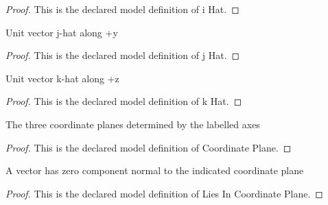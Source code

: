 \begin{proof}
  This is the declared model definition of i Hat.
\end{proof}
\begin{definition}[j Hat]
  \label{def:physics:phyx-mini-0792:phyxminiproblems-problemphyxmini0792-jhat}
  Unit vector j-hat along +y
\end{definition}
\begin{proof}
  This is the declared model definition of j Hat.
\end{proof}
\begin{definition}[k Hat]
  \label{def:physics:phyx-mini-0792:phyxminiproblems-problemphyxmini0792-khat}
  Unit vector k-hat along +z
\end{definition}
\begin{proof}
  This is the declared model definition of k Hat.
\end{proof}
\begin{definition}
  \label{def:physics:phyx-mini-0792:phyxminiproblems-problemphyxmini0792-coordinateplane}
  The three coordinate planes determined by the labelled axes
\end{definition}
\begin{proof}
  This is the declared model definition of Coordinate Plane.
\end{proof}
\begin{definition}
  \label{def:physics:phyx-mini-0792:phyxminiproblems-problemphyxmini0792-liesincoordinateplane}
  A vector has zero component normal to the indicated coordinate plane
\end{definition}
\begin{proof}
  This is the declared model definition of Lies In Coordinate Plane.
\end{proof}
